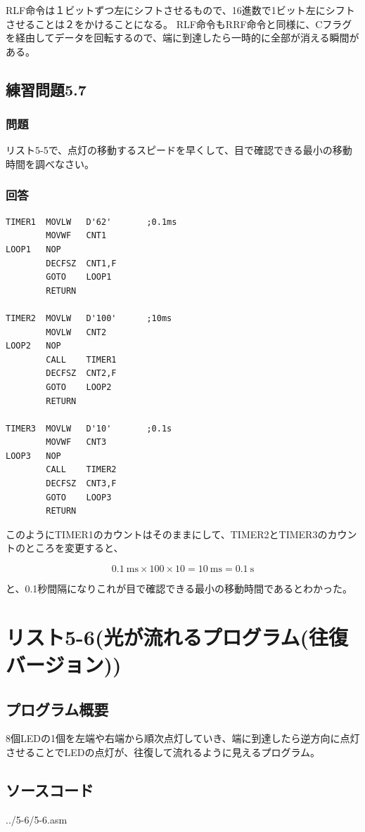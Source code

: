 \documentclass[a4paper,12pt]{ujarticle}
\begin{document}
  RLF命令は１ビットずつ左にシフトさせるもので、16進数で1ビット左にシフトさせることは２をかけることになる。
  RLF命令もRRF命令と同様に、Cフラグを経由してデータを回転するので、端に到達したら一時的に全部が消える瞬間がある。
  \subsection{練習問題5.7}
   \subsubsection{問題}
   リスト5-5で、点灯の移動するスピードを早くして、目で確認できる最小の移動時間を調べなさい。
   \subsubsection{回答}
  \begin{lstlisting}[basicstyle=\ttfamily\footnotesize, frame=single]
TIMER1  MOVLW   D'62'       ;0.1ms
        MOVWF   CNT1
LOOP1   NOP
        DECFSZ  CNT1,F
        GOTO    LOOP1
        RETURN

TIMER2  MOVLW   D'100'      ;10ms
        MOVLW   CNT2
LOOP2   NOP
        CALL    TIMER1
        DECFSZ  CNT2,F
        GOTO    LOOP2
        RETURN

TIMER3  MOVLW   D'10'       ;0.1s
        MOVWF   CNT3
LOOP3   NOP
        CALL    TIMER2
        DECFSZ  CNT3,F
        GOTO    LOOP3
        RETURN
  \end{lstlisting}
  このようにTIMER1のカウントはそのままにして、TIMER2とTIMER3のカウントのところを変更すると、

  \[
   \SI{0.1}{\milli\second} \times 100 \times 10 = \SI{10}{\milli\second} = \SI{0.1}{\second}
  \]

  と、0.1秒間隔になりこれが目で確認できる最小の移動時間であるとわかった。

  \clearpage
 \section{リスト5-6(光が流れるプログラム(往復バージョン))}
  \subsection{プログラム概要}
  8個LEDの1個を左端や右端から順次点灯していき、端に到達したら逆方向に点灯させることでLEDの点灯が、往復して流れるように見えるプログラム。
  \subsection{ソースコード}
  \begin{lstinputlisting}[basicstyle=\ttfamily\footnotesize, frame=single]
   {../5-6/5-6.asm}
  \end{lstinputlisting}
  \clearpage
\end{document}
